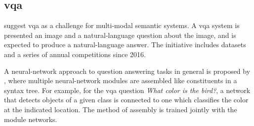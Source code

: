 \subsection{\Acrfull{vqa}}

\cite{AgrawalVQAVisualQuestion2015} suggest \gls{vqa} as a challenge for multi-modal semantic systems.
A \gls{vqa} system is presented an image and a natural-language question about the image, and is expected to produce a natural-language answer.
The initiative includes datasets and a series of annual competitions since 2016.

A neural-network approach to question answering tasks in general is proposed by \cite{AndreasLearningComposeNeural2016}, where multiple neural-network modules are assembled like constituents in a syntax tree.
For example, for the \gls{vqa} question \textit{What color is the bird?}, a network that detects objects of a given class is connected to one which classifies the color at the indicated location.
The method of assembly is trained jointly with the module networks.



